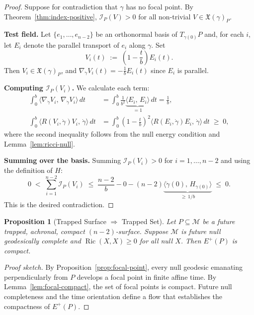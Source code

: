 \documentclass[12pt, a4paper]{article}
\theoremstyle{plain}
\newtheorem{proposition}[theorem]{Proposition}
\theoremstyle{definition}
\theoremstyle{remark}
\newcommand{\M}{\mathcal{M}}
\newcommand{\Ric}{\operatorname{Ric}}
\newcommand{\Ind}{\mathcal{I}}
\newcommand{\ls}[2]{\langle #1,\, #2 \rangle}
\begin{document}
\begin{proof}
  Suppose for contradiction that $\gamma$ has no focal point. By
  Theorem~\ref{thm:index-positive}, $\Ind_P(V) > 0$ for all
  non-trivial $V \in \mathfrak{X}(\gamma)_P$.

  \medskip\noindent\textbf{Test field.}
  Let $\{e_1,\ldots,e_{n-2}\}$ be an orthonormal basis of $T_{\gamma(0)}P$
  and, for each $i$, let $E_i$ denote the parallel transport of $e_i$
  along $\gamma$. Set
  \[
    V_i(t) \;:=\; \left(1 - \frac{t}{b}\right) E_i(t).
  \]
  Then $V_i \in \mathfrak{X}(\gamma)_P$, and $\nabla_{\dot{\gamma}} V_i(t) = -\frac{1}{b} E_i(t)$ since
  $E_i$ is parallel.

  \medskip\noindent\textbf{Computing $\Ind_P(V_i)$.}
  We calculate each term:
  \begin{align*}
    \int_0^b \ls{\nabla_{\dot{\gamma}} V_i}{\nabla_{\dot{\gamma}} V_i}\,dt
    &= \int_0^b \frac{1}{b^2}\underbrace{\ls{E_i}{E_i}}_{=1}\,dt
     = \frac{1}{b},\\
    \int_0^b \ls{R(V_i,\dot{\gamma})V_i}{\dot{\gamma}}\,dt
    &= \int_0^b \!\left(1-\tfrac{t}{b}\right)^2
       \ls{R(E_i,\dot{\gamma})E_i}{\dot{\gamma}}\,dt \;\geq\; 0,
  \end{align*}
  where the second inequality follows from the null energy condition and
  Lemma~\ref{lem:ricci-null}.

  \medskip\noindent\textbf{Summing over the basis.}
  Summing $\Ind_P(V_i) > 0$ for $i = 1,\ldots,n-2$ and using the
  definition of $H$:
  \[
    0 \;<\; \sum_{i=1}^{n-2} \Ind_P(V_i)
    \;\leq\; \frac{n-2}{b}
             - 0
             - (n-2)\underbrace{\ls{\dot{\gamma}(0)}{H_{\gamma(0)}}}_{\geq\,1/b}
    \;\leq\; 0.
  \]
  This is the desired contradiction.
\end{proof}

\begin{proposition}[Trapped Surface $\Rightarrow$ Trapped Set]
\label{prop:trapped-set}
  Let $P \subseteq \M$ be a future trapped, achronal, compact $(n-2)$-surface.
  Suppose $\M$ is future null geodesically complete and $\Ric(X,X) \geq 0$
  for all null $X$. Then $E^+(P)$ is compact.
\end{proposition}

\begin{proof}[Proof sketch]
  By Proposition~\ref{prop:focal-point}, every null geodesic emanating
  perpendicularly from $P$ develops a focal point in finite affine time.
  By Lemma~\ref{lem:focal-compact}, the set of focal points is compact.
  Future null completeness and the time orientation define a flow that
  establishes the compactness of $E^+(P)$.
\end{proof}
\end{document}
